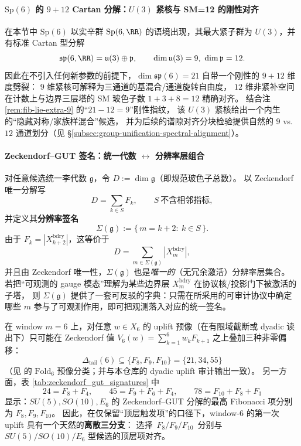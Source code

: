 \paragraph{\texorpdfstring{$\mathrm{Sp}(6)$}{Sp(6)} 的 $9+12$ Cartan 分解：\texorpdfstring{$U(3)$}{U(3)} 紧核与 SM=12 的刚性对齐}
在本节中 \(\mathrm{Sp}(6)\) 以实辛群 \(\mathrm{Sp}(6,\RR)\) 的语境出现，其最大紧子群为 \(U(3)\)，并有标准 Cartan 型分解
\[
\mathfrak{sp}(6,\RR)=\mathfrak{u}(3)\oplus \mathfrak{p},\qquad \dim\mathfrak{u}(3)=9,\ \dim\mathfrak{p}=12.
\]
因此在不引入任何新参数的前提下，\(\dim\mathfrak{sp}(6)=21\) 自带一个刚性的 \(9+12\) 维度劈裂：
\(9\) 维紧核可解释为三通道的基混合/通道旋转自由度，
\(12\) 维非紧补空间在计数上与边界三层塔的 SM 玻色子数 \(1+3+8=12\) 精确对齐。
结合注 \ref{rem:fib-lie-extra-9} 的“\(21-12=9\)”刚性指纹，
该 \(U(3)\) 紧核给出一个内生的“隐藏对称/家族样混合”候选，
并为后续的谱隙对齐分块检验提供自然的 \(9\) vs.\ \(12\) 通道划分（见 \S\ref{subsec:group-unification-spectral-alignment}）。

\paragraph{Zeckendorf--GUT 签名：统一代数 \texorpdfstring{$\leftrightarrow$}{<->} 分辨率层组合}
对任意候选统一李代数 \(\mathfrak g\)，令 \(D:=\dim\mathfrak g\)（即规范玻色子总数）。
以 Zeckendorf 唯一分解写
\[
D=\sum_{k\in S}F_k,\qquad S\ \text{不含相邻指标},
\]
并定义其\textbf{分辨率签名}
\[
\Sigma(\mathfrak g):=\{\,m=k+2:\ k\in S\,\}.
\]
由于 \(F_k=|X^{\mathrm{bdry}}_{k+2}|\)，这等价于
\[
D=\sum_{m\in\Sigma(\mathfrak g)}|X_m^{\mathrm{bdry}}|,
\]
并且由 Zeckendorf 唯一性，\(\Sigma(\mathfrak g)\) 也是\emph{唯一的}（无冗余激活）分辨率层集合。
若把“可观测的 gauge 模态”理解为某些边界层 \(X_m^{\mathrm{bdry}}\) 在协议核/投影门下被激活的子塔，
则 \(\Sigma(\mathfrak g)\) 提供了一套可反驳的字典：只需在所采用的可审计协议中确定哪些 \(m\) 参与了可观测作用，即可把观测落入对应的统一签名。



\begin{corollary}\label{cor:fold6-tail-offsets-gut-top-terms}
在 window \(m=6\) 上，对任意 \(w\in X_6\) 的 uplift 预像（在有限域截断或 dyadic 读出下）只可能在 Zeckendorf 值
\(
V_6(w)=\sum_{k=1}^{6}w_kF_{k+1}
\)
之上叠加三种非零偏移：
\[
\Delta_{\mathrm{tail}}(6)\subseteq \{F_8,F_9,F_{10}\}=\{21,34,55\}
\]
（见 \cite{Internal2025ResolutionFoldingPhiPiE} 的 \(\mathrm{Fold}_6\) 预像分类；并与本仓库的 dyadic uplift 审计输出一致）。
另一方面，表 \ref{tab:zeckendorf_gut_signatures} 中
\[
24=F_8+F_4,\qquad 45=F_9+F_6+F_4,\qquad 78=F_{10}+F_8+F_3
\]
显示：\(SU(5),SO(10),E_6\) 的 Zeckendorf--GUT 分解的最高 Fibonacci 项分别为 \(F_8,F_9,F_{10}\)。
因此，在仅保留“顶层触发项”的口径下，window-\(6\) 的第一次 uplift 具有一个天然的\textbf{离散三分支}：
选择 \(\,F_8/F_9/F_{10}\,\) 分别与 \(SU(5)/SO(10)/E_6\) 型候选的顶层项对齐。
\end{corollary}

